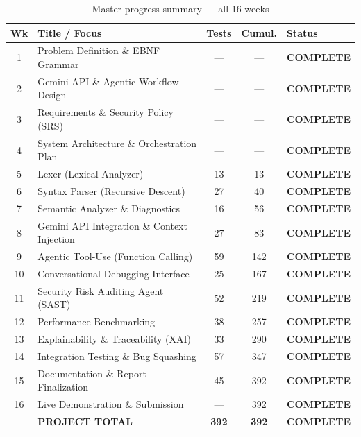 \documentclass[a4paper,11pt]{article}
\newcommand{\done}{\colorbox{green!25}{\textbf{\small COMPLETE}}}
\begin{document}
\begin{table}[h!]
\centering
\begin{tabularx}{\textwidth}{|c|l|c|c|l|}
\hline
\rowcolor{blue!14}
\textbf{Wk} & \textbf{Title / Focus} & \textbf{Tests} & \textbf{Cumul.} & \textbf{Status} \\
\hline
1  & Problem Definition \& EBNF Grammar         & ---  & ---  & \done \\
2  & Gemini API \& Agentic Workflow Design       & ---  & ---  & \done \\
3  & Requirements \& Security Policy (SRS)       & ---  & ---  & \done \\
4  & System Architecture \& Orchestration Plan   & ---  & ---  & \done \\
5  & Lexer (Lexical Analyzer)                    & 13   & 13   & \done \\
6  & Syntax Parser (Recursive Descent)           & 27   & 40   & \done \\
7  & Semantic Analyzer \& Diagnostics            & 16   & 56   & \done \\
8  & Gemini API Integration \& Context Injection  & 27   & 83   & \done \\
9  & Agentic Tool-Use (Function Calling)          & 59   & 142  & \done \\
10 & Conversational Debugging Interface           & 25   & 167  & \done \\
11 & Security Risk Auditing Agent (SAST)          & 52   & 219  & \done \\
12 & Performance Benchmarking                     & 38   & 257  & \done \\
13 & Explainability \& Traceability (XAI)         & 33   & 290  & \done \\
14 & Integration Testing \& Bug Squashing         & 57   & 347  & \done \\
15 & Documentation \& Report Finalization         & 45   & 392  & \done \\
16 & Live Demonstration \& Submission             & ---  & 392  & \done \\
\hline
\rowcolor{blue!8}
   & \textbf{PROJECT TOTAL}                      & \textbf{392} & \textbf{392} & \textbf{\done} \\
\hline
\end{tabularx}
\caption{Master progress summary --- all 16 weeks}
\end{table}
\end{document}

